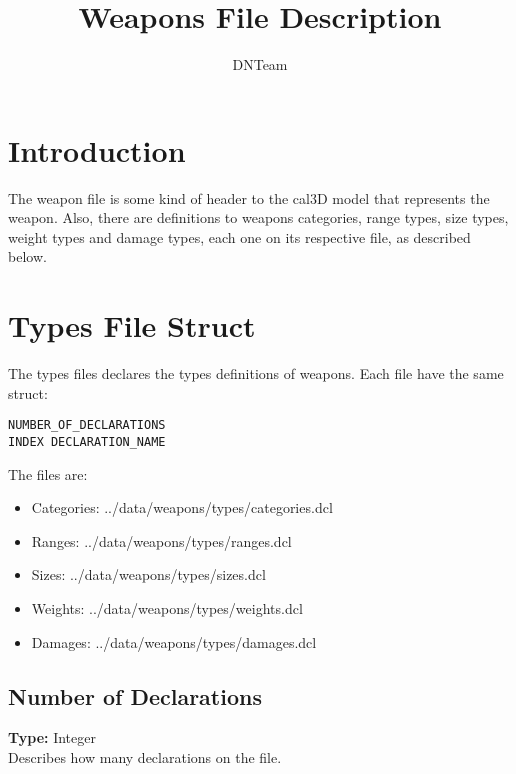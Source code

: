 \documentclass[letterpaper,12pt]{article}
\begin{document}
\title{Weapons File Description}

\author{
DNTeam
}

\maketitle


\newpage

\tableofcontents

\newpage

\section{Introduction}

  The weapon file is some kind of header to the cal3D model that represents
the weapon. Also, there are definitions to weapons categories, range types,
size types, weight types and damage types, each one on its respective file,
as described below.

\section{Types File Struct}

The types files declares the types definitions of weapons. Each file have the
same struct:

\begin{verbatim}
NUMBER_OF_DECLARATIONS
INDEX DECLARATION_NAME
\end{verbatim}

The files are:

\begin{itemize}
\item{Categories: ../data/weapons/types/categories.dcl}
\item{Ranges: ../data/weapons/types/ranges.dcl}
\item{Sizes: ../data/weapons/types/sizes.dcl}
\item{Weights: ../data/weapons/types/weights.dcl}
\item{Damages: ../data/weapons/types/damages.dcl}
\end{itemize}

\subsection{Number of Declarations}
{\bf Type: }Integer\\
Describes how many declarations on the file.
\end{document}
